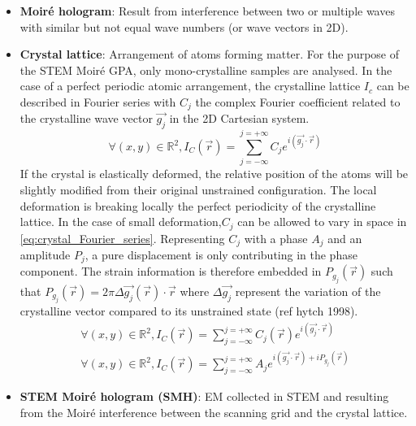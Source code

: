\documentclass[12pt]{article}
\begin{document}
\begin{itemize}
\item \textbf{Moir{\'e} hologram}: Result from interference between two or multiple waves with similar but not equal wave numbers (or wave vectors in 2D). 
\item \textbf{Crystal lattice}: Arrangement of atoms forming matter.\newline
For the purpose of the STEM Moir{\'e} GPA, only mono-crystalline samples are analysed. In the case of a perfect periodic atomic arrangement, the crystalline lattice $I_c$ can be described in Fourier series with $C_j$ the complex Fourier coefficient related to the crystalline wave vector $\vec{g_j}$ in the 2D Cartesian system.
\begin{equation}
\forall (x,y) \in \mathbb{R}^{2},I_C(\vec{r})=\sum_{j=-\infty}^{j=+\infty}C_je^{i(\vec{g_j}\cdot\vec{r})}
\label{eq:crystal_Fourier_series}
\end{equation}
If the crystal is elastically deformed, the relative position of the atoms will be slightly modified from their original unstrained configuration. The local deformation is breaking locally the perfect periodicity of the crystalline lattice. In the case of small deformation,$C_j$ can be allowed to vary in space in \cref{eq:crystal_Fourier_series}. Representing $C_j$ with a phase $A_j$ and an amplitude $P_j$, a pure displacement is only contributing in the phase component. The strain information is therefore embedded in $P_{g_{j}}(\vec{r})$ such that $P_{g_{j}}(\vec{r})=2\pi\Delta \vec{g_{j}}(\vec{r})\cdot\vec{r}$ where $\Delta \vec{g_j}$ represent the variation of the crystalline vector compared to its unstrained state (ref hytch 1998).
\begin{equation}
\begin{gathered}
\forall (x,y) \in \mathbb{R}^{2},I_C(\vec{r})=\sum_{j=-\infty}^{j=+\infty}C_j(\vec{r})e^{i(\vec{g_j}\cdot\vec{r})} \\
\forall (x,y) \in \mathbb{R}^{2},I_C(\vec{r})=\sum_{j=-\infty}^{j=+\infty}A_je^{i(\vec{g_j}\cdot\vec{r})+iP_{g_{j}}(\vec{r})}
\end{gathered}
\label{eq:crystal_strain_Fourier_series}
\end{equation}

\item \textbf{STEM Moir{\'e} hologram (SMH)}: EM collected in STEM and resulting from the 
Moir{\'e} interference between the scanning grid and the crystal lattice.


\end{itemize}
\end{document}
